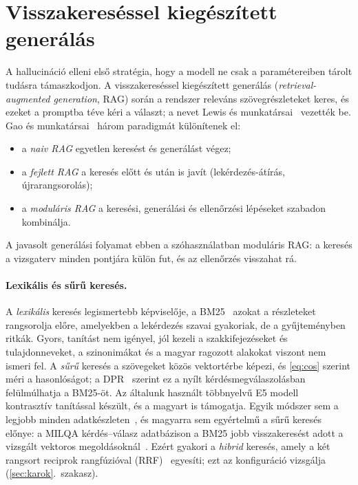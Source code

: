 \section{Visszakereséssel kiegészített generálás}
\label{sec:irod-rag}

A hallucináció elleni első stratégia, hogy a modell ne csak a paramétereiben tárolt tudásra
támaszkodjon. A visszakereséssel kiegészített generálás (\emph{retrieval-augmented generation}, RAG)
során a rendszer releváns szövegrészleteket keres, és ezeket a promptba téve kéri a választ; a nevet Lewis
és munkatársai~\cite{lewis2020rag} vezették be. Gao és munkatársai~\cite{gao2023ragsurvey} három paradigmát
különítenek el:
\begin{itemize}[leftmargin=*,itemsep=1pt,topsep=2pt]
\item a \emph{naiv RAG} egyetlen keresést és generálást végez;
\item a \emph{fejlett RAG} a keresés előtt és után is javít (lekérdezés-átírás, újrarangsorolás);
\item a \emph{moduláris RAG} a keresési, generálási és ellenőrzési lépéseket szabadon kombinálja.
\end{itemize}
A javasolt generálási folyamat ebben a szóhasználatban
moduláris RAG: a keresés a vizsgaterv minden pontjára külön fut, és az ellenőrzés visszahat rá.

\paragraph{Lexikális és sűrű keresés.} A \emph{lexikális} keresés legismertebb képviselője, a
BM25~\cite{robertson2009bm25} azokat a részleteket rangsorolja előre, amelyekben a lekérdezés szavai
gyakoriak, de a gyűjteményben ritkák. Gyors, tanítást nem igényel, jól kezeli a szakkifejezéseket és
tulajdonneveket, a szinonimákat és a magyar ragozott alakokat viszont nem ismeri fel. A \emph{sűrű} keresés
a szövegeket közös vektortérbe képezi, és \eqref{eq:cos} szerint méri a hasonlóságot; a
DPR~\cite{karpukhin2020dpr} szerint ez a nyílt kérdésmegválaszolásban felülmúlhatja a BM25-öt. Az általunk
használt többnyelvű E5 modell~\cite{wang2024me5} kontrasztív tanítással készült, és a magyart is
támogatja. Egyik módszer sem a legjobb minden adatkészleten~\cite{thakur2021beir}, és magyarra sem
egyértelmű a sűrű keresés előnye: a MILQA kérdés--válasz adatbázison a BM25 jobb visszakeresést adott a
vizsgált vektoros megoldásoknál~\cite{novak2023milqa}. Ezért gyakori a \emph{hibrid} keresés, amely a két
rangsort reciprok rangfúzióval (RRF)~\cite{cormack2009rrf} egyesíti; ezt az  konfiguráció vizsgálja
(\ref{sec:karok}.~szakasz).


